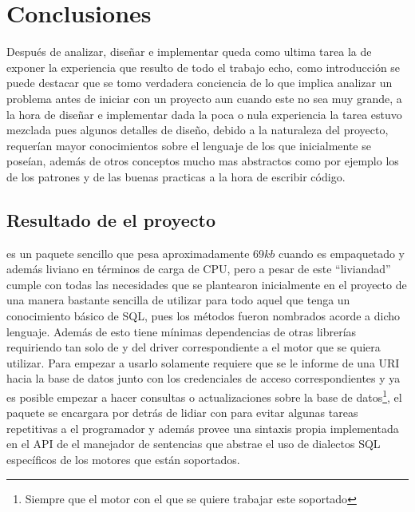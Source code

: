 \chapter*{Conclusiones}
%
%
Después de analizar, diseñar e implementar queda como ultima tarea la de exponer la experiencia que resulto de todo el trabajo echo, como introducción se puede destacar que se tomo verdadera conciencia de lo que implica analizar un problema antes de iniciar con un proyecto aun cuando este no sea muy grande, a la hora de diseñar e implementar dada la poca o nula experiencia la tarea estuvo mezclada pues algunos detalles de diseño, debido a la naturaleza del proyecto, requerían mayor conocimientos sobre el lenguaje de los que inicialmente se poseían, además de otros conceptos mucho mas abstractos como por ejemplo los de los patrones y de las buenas practicas a la hora de escribir código.
%
%
\section{Resultado de el proyecto}
%
\jj es un paquete sencillo que pesa aproximadamente 69$kb$ cuando es empaquetado y además liviano en términos de carga de CPU, pero a pesar de este ``liviandad'' cumple con todas las necesidades que se plantearon inicialmente en el proyecto de una manera bastante sencilla de utilizar para todo aquel que tenga un conocimiento básico de SQL, pues los métodos fueron nombrados acorde a dicho lenguaje. Además de esto tiene mínimas dependencias de otras librerías requiriendo tan solo de \jd y del driver correspondiente a el motor que se quiera utilizar. Para empezar a usarlo solamente requiere que se le informe de una URI hacia la base de datos junto con los credenciales de acceso correspondientes y ya es posible empezar a hacer consultas o actualizaciones sobre la base de datos\footnote{Siempre que el motor con el que se quiere trabajar este soportado}, el paquete se encargara por detrás de lidiar con \jd para evitar algunas tareas repetitivas a el programador y además provee una sintaxis propia implementada en el API de el manejador de sentencias que abstrae el uso de dialectos SQL específicos de los motores que están soportados.

